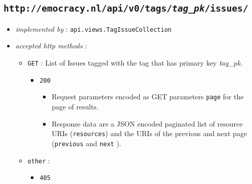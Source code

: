 \documentclass[a4paper]{report}
\begin{document}
\subsection{\texttt{http://emocracy.nl/api/v0/tags/\emph{tag\_pk}/issues/}}
\begin{itemize}
    \item{\textsl{implemented by} : \texttt{api.views.TagIssueCollection}}
    \item{\textsl{accepted http methods} :
        \begin{itemize}
            \item{\texttt{GET} : List of Issues tagged with the tag that has primary key \emph{tag\_pk}.}
                \begin{itemize}
                    \item{\texttt{200}
                    \begin{itemize}
                        \item{Request parameters encoded as GET parameters 
                        \texttt{page} for the page of results.}
                        \item{Response data are a JSON encoded paginated list of 
                        resource URIs (\texttt{resources}) and the URIs of the 
                        previous and next page (\texttt{previous} and \texttt{next}
                        ).}
                    \end{itemize}
                    }
                \end{itemize}
            
            
            \item{\texttt{other} :
                \begin{itemize}
                    \item{\texttt{405}}
                \end{itemize}
            }
        \end{itemize}
    }
\end{itemize}
\end{document}
